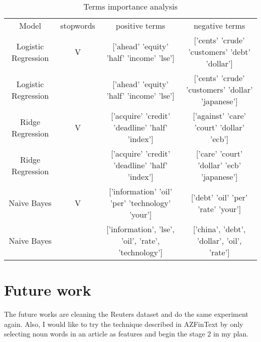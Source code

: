 \documentclass[sigconf]{acmart}
\begin{document}
\begin{table*}
\centering
\begin{tabular}{cccc}
Model               & stopwords & positive terms                                                                             & negative terms                                                                      \\
Logistic Regression & V         & {[}'ahead' 'equity' 'half' 'income' 'lse'{]}               & {[}'cents' 'crude' 'customers' 'debt' 'dollar'{]} \\
Logistic Regression &           & {[}'ahead' 'equity' 'half' 'income' 'lse'{]}               & {[}'cents' 'crude' 'customers' 'dollar' 'japanese'{]} \\
Ridge Regression    & V         & {[}'acquire' 'credit' 'deadline' 'half' 'index'{]} & {[}'against' 'care' 'court' 'dollar' 'ecb'{]}   \\
Ridge Regression    &           & {[}'acquire' 'credit' 'deadline' 'half' 'index'{]} & {[}'care' 'court' 'dollar' 'ecb' 'japanese'{]}  \\
Naive Bayes         & V         & {[}'information' 'oil' 'per' 'technology' 'your'{]}                                        & {[}'debt' 'oil' 'per' 'rate' 'your'{]}                                              \\
Naive Bayes         &           & {[}'information', 'lse', 'oil', 'rate', 'technology'{]}                                    & {[}'china', 'debt', 'dollar', 'oil', 'rate'{]}                                     
\end{tabular}
\caption{Terms importance analysis}
\label{table:importance}
\end{table*}

\section{Future work}
The future works are cleaning the Reuters dataset and do the same experiment again. Also, I would like to try the technique described in AZFinText
by only selecting noun words in an article as features and begin the stage 2 in my plan.


 
\end{document}
